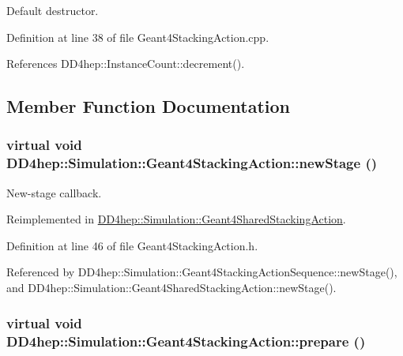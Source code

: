 Default destructor. 

Definition at line 38 of file Geant4StackingAction.cpp.

References DD4hep::InstanceCount::decrement().

\subsection{Member Function Documentation}
\hypertarget{class_d_d4hep_1_1_simulation_1_1_geant4_stacking_action_a2709ba86b13b0574dcd1d8e580209d0b}{
\subsubsection[{newStage}]{\setlength{\rightskip}{0pt plus 5cm}virtual void DD4hep::Simulation::Geant4StackingAction::newStage ()}}
\label{class_d_d4hep_1_1_simulation_1_1_geant4_stacking_action_a2709ba86b13b0574dcd1d8e580209d0b}


New-\/stage callback. 

Reimplemented in \hyperlink{class_d_d4hep_1_1_simulation_1_1_geant4_shared_stacking_action_af92666552c404908a7e99c8145846c5f}{DD4hep::Simulation::Geant4SharedStackingAction}.

Definition at line 46 of file Geant4StackingAction.h.

Referenced by DD4hep::Simulation::Geant4StackingActionSequence::newStage(), and DD4hep::Simulation::Geant4SharedStackingAction::newStage().\hypertarget{class_d_d4hep_1_1_simulation_1_1_geant4_stacking_action_a3974c0e7b737bdccced8c196fc316b5b}{
\subsubsection[{prepare}]{\setlength{\rightskip}{0pt plus 5cm}virtual void DD4hep::Simulation::Geant4StackingAction::prepare ()}}
\label{class_d_d4hep_1_1_simulation_1_1_geant4_stacking_action_a3974c0e7b737bdccced8c196fc316b5b}


